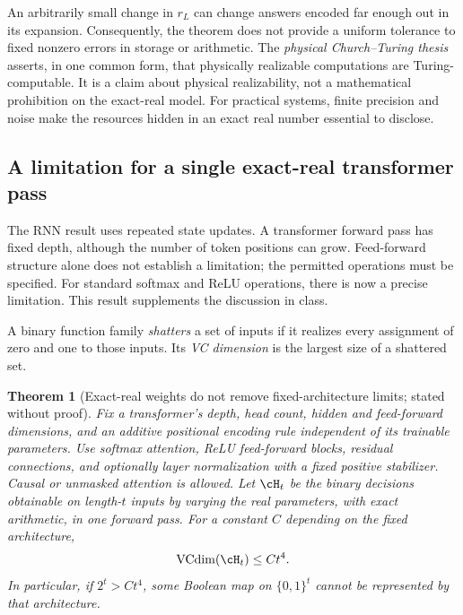 \documentclass[11pt,twoside]{article}
\newtheorem{theorem}{Theorem}[section]
\theoremstyle{definition}
\theoremstyle{remark}
\begin{document}
An arbitrarily small change in $r_L$ can change answers encoded far enough
out in its expansion. Consequently, the theorem does not provide a
uniform tolerance to fixed nonzero errors in storage or arithmetic.
The \emph{physical Church--Turing thesis} asserts, in one common form,
that physically realizable computations are Turing-computable. It is a
claim about physical realizability, not a mathematical prohibition on
the exact-real model. For practical systems, finite precision and noise
make the resources hidden in an exact real number essential to disclose.

\subsection{A limitation for a single exact-real transformer pass}

The RNN result uses repeated state updates. A transformer forward pass has
fixed depth, although the number of token positions can grow. Feed-forward
structure alone does not establish a limitation; the permitted operations
must be specified. For standard softmax and ReLU operations, there is now
a precise limitation. This result supplements the discussion in class.

A binary function family \emph{shatters} a set of inputs if it realizes
every assignment of zero and one to those inputs. Its \emph{VC dimension}
is the largest size of a shattered set.

\begin{theorem}[Exact-real weights do not remove fixed-architecture limits; stated without proof]
\label{thm:real-transformer}
Fix a transformer's depth, head count, hidden and feed-forward dimensions,
and an additive positional encoding rule independent of its trainable
parameters. Use softmax attention, ReLU feed-forward blocks, residual
connections, and optionally layer normalization with a fixed positive
stabilizer. Causal or unmasked attention is allowed. Let $\cH_t$ be the
binary decisions obtainable on length-$t$ inputs by varying the real
parameters, with exact arithmetic, in one forward pass. For a constant
$C$ depending on the fixed architecture,
\begin{equation}
 \operatorname{VCdim}(\cH_t)\leq Ct^4.
 \label{eq:real-vc}
\end{equation}
In particular, if $2^t>Ct^4$, some Boolean map on $\{0,1\}^t$ cannot
be represented by that architecture.
\end{theorem}
\end{document}
